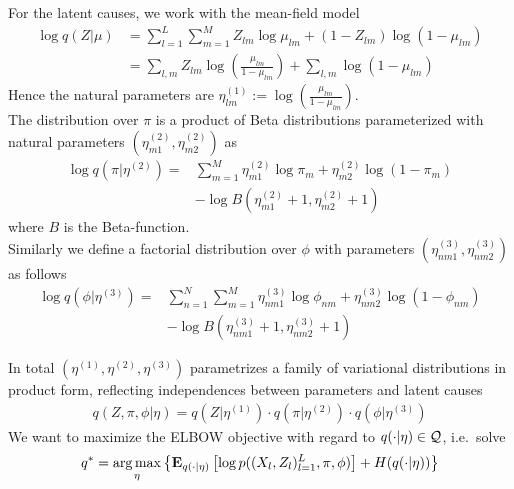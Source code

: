 \documentclass{article}
\DeclareMathOperator*{\argmax}{arg\,max}
\newcommand{\E}{{\bf E}}
\begin{document}
For the latent causes, we work with the mean-field model 
\begin{align}
\log q(Z| \mu) 
&  = \sum_{l=1}^L \sum_{m=1}^M Z_{lm} \log \mu_{lm} + (1-Z_{lm}) \log (1-\mu_{lm})  
\\ & = \sum_{l,m} Z_{lm}  \log \left( \frac{\mu_{lm}}{1-\mu_{lm}} \right) + \sum_{l,m} \log (1-\mu_{lm}) 
\end{align}
Hence the natural parameters are $\eta^{(1)}_{lm} :=  \log \left( \frac{\mu_{lm}}{1-\mu_{lm}} \right)$.\\

The distribution over $\pi$ is a product of Beta distributions parameterized with natural parameters $(\eta^{(2)}_{m1},\eta^{(2)}_{m2})$ as
\begin{align}
\log q(\pi |\eta^{(2)}) = & \sum_{m=1}^M  \eta^{(2)}_{m1} \log \pi_m + \eta^{(2)}_{m2} \log (1-\pi_m) \\
\nonumber & - \log B(\eta^{(2)}_{m1}+1,\eta^{(2)}_{m2}+1)
\end{align}
where $B$ is the Beta-function.\\

Similarly we define a factorial distribution over $\phi$ with parameters $(\eta^{(3)}_{nm1}, \eta^{(3)}_{nm2})$ as follows 
\begin{align}
\log q(\phi |\eta^{(3)}) = & \sum_{n=1}^N \sum_{m=1}^M  \eta^{(3)}_{nm1} \log \phi_{nm} + \eta^{(3)}_{nm2} \log (1-\phi_{nm}) \\
\nonumber & - \log B(\eta^{(3)}_{nm1}+1,\eta^{(3)}_{nm2}+1)
\end{align}

In total $(\eta^{(1)},\eta^{(2)},\eta^{(3)})$ parametrizes a family of variational distributions in product form, reflecting independences between parameters and latent causes 
\begin{align}
q(Z,\pi,\phi | \eta) = q(Z | \eta^{(1)}) \cdot q(\pi | \eta^{(2)}) \cdot q(\phi | \eta^{(3)})
\end{align}
 We want to maximize the ELBOW objective with regard to $q(\cdot | \eta) \in {\cal Q}$, i.e.~solve
\begin{align}
q^* = \argmax_{\eta} \left\{ \E_{q(\cdot|\eta)} \left[ \log p( (X_l,Z_l)_{l=1}^L, \pi,\phi) \right] + H(q(\cdot|\eta)) \right\}
\end{align}


 
\end{document}
